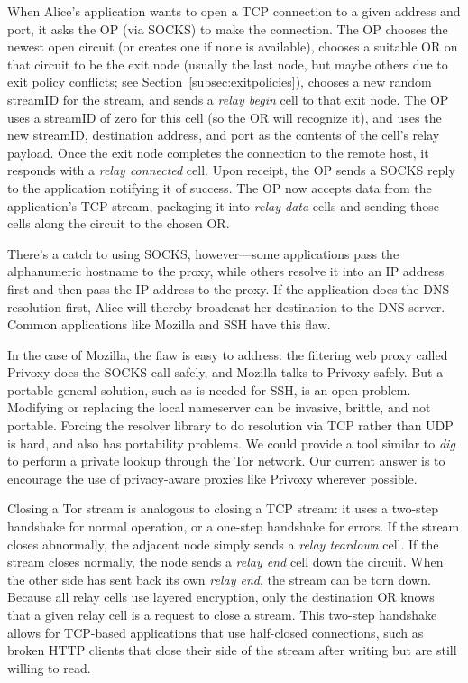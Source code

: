 \documentclass[times,10pt,twocolumn]{article}
\begin{document}
\label{subsec:tcp}

When Alice's application wants to open a TCP connection to a given
address and port, it asks the OP (via SOCKS) to make the
connection. The OP chooses the newest open circuit (or creates one if
none is available), chooses a suitable OR on that circuit to be the
exit node (usually the last node, but maybe others due to exit policy
conflicts; see Section~\ref{subsec:exitpolicies}), chooses a new
random streamID for the stream, and sends a \emph{relay begin} cell
to that exit node.  The OP uses a streamID of zero for this cell
(so the OR will recognize it), and uses the new streamID, destination
address, and port as the contents of the cell's relay payload.  Once the
exit node completes the connection to the remote host, it responds
with a \emph{relay connected} cell.  Upon receipt, the OP sends a
SOCKS reply to the application notifying it of success. The OP
now accepts data from the application's TCP stream, packaging it into
\emph{relay data} cells and sending those cells along the circuit to
the chosen OR.

There's a catch to using SOCKS, however---some applications pass the
alphanumeric hostname to the proxy, while others resolve it into an IP
address first and then pass the IP address to the proxy.  If the
application does the DNS resolution first, Alice will thereby
broadcast her destination to the DNS server.  Common applications
like Mozilla and SSH have this flaw.

In the case of Mozilla, the flaw is easy to address: the filtering web
proxy called Privoxy does the SOCKS call safely, and Mozilla talks to
Privoxy safely. But a portable general solution, such as is needed for
SSH, is
an open problem. Modifying or replacing the local nameserver
can be invasive, brittle, and not portable. Forcing the resolver
library to do resolution via TCP rather than UDP is
hard, and also has portability problems. We could provide a
tool similar to \emph{dig} to perform a private lookup through the
Tor network. Our current answer is to encourage the use of
privacy-aware proxies like Privoxy wherever possible.

Closing a Tor stream is analogous to closing a TCP stream: it uses a
two-step handshake for normal operation, or a one-step handshake for
errors. If the stream closes abnormally, the adjacent node simply sends a
\emph{relay teardown} cell. If the stream closes normally, the node sends
a \emph{relay end} cell down the circuit. When the other side has sent
back its own \emph{relay end}, the stream can be torn down.  Because
all relay cells use layered encryption, only the destination OR knows
that a given relay cell is a request to close a stream.  This two-step
handshake allows for TCP-based applications that use half-closed
connections, such as broken HTTP clients that close their side of the
stream after writing but are still willing to read.
\end{document}
